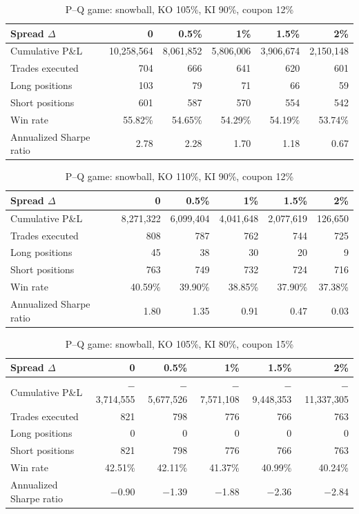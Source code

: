 \documentclass[12pt,letterpaper]{article}
\begin{document}
\begin{table}[ht]
\singlespacing
\centering
\caption{P--Q game: snowball, KO 105\%, KI 90\%, coupon 12\%}
\label{tab:snow3}
\begin{tabular}{lrrrrr}
\toprule
Spread $\Delta$ & 0 & 0.5\% & 1\% & 1.5\% & 2\% \\
\midrule
Cumulative P\&L & 10{,}258{,}564 & 8{,}061{,}852 & 5{,}806{,}006 & 3{,}906{,}674 & 2{,}150{,}148 \\
Trades executed & 704 & 666 & 641 & 620 & 601 \\
Long positions  & 103 & 79 & 71 & 66 & 59 \\
Short positions & 601 & 587 & 570 & 554 & 542 \\
Win rate & 55.82\% & 54.65\% & 54.29\% & 54.19\% & 53.74\% \\
Annualized Sharpe ratio & 2.78 & 2.28 & 1.70 & 1.18 & 0.67 \\
\bottomrule
\end{tabular}
\end{table}

\begin{table}[ht]
\singlespacing
\centering
\caption{P--Q game: snowball, KO 110\%, KI 90\%, coupon 12\%}
\label{tab:snow4}
\begin{tabular}{lrrrrr}
\toprule
Spread $\Delta$ & 0 & 0.5\% & 1\% & 1.5\% & 2\% \\
\midrule
Cumulative P\&L & 8{,}271{,}322 & 6{,}099{,}404 & 4{,}041{,}648 & 2{,}077{,}619 & 126{,}650 \\
Trades executed & 808 & 787 & 762 & 744 & 725 \\
Long positions  & 45 & 38 & 30 & 20 & 9 \\
Short positions & 763 & 749 & 732 & 724 & 716 \\
Win rate & 40.59\% & 39.90\% & 38.85\% & 37.90\% & 37.38\% \\
Annualized Sharpe ratio & 1.80 & 1.35 & 0.91 & 0.47 & 0.03 \\
\bottomrule
\end{tabular}
\end{table}

\begin{table}[ht]
\singlespacing
\centering
\caption{P--Q game: snowball, KO 105\%, KI 80\%, coupon 15\%}
\label{tab:snow5}
\begin{tabular}{lrrrrr}
\toprule
Spread $\Delta$ & 0 & 0.5\% & 1\% & 1.5\% & 2\% \\
\midrule
Cumulative P\&L & $-$3{,}714{,}555 & $-$5{,}677{,}526 & $-$7{,}571{,}108 & $-$9{,}448{,}353 & $-$11{,}337{,}305 \\
Trades executed & 821 & 798 & 776 & 766 & 763 \\
Long positions  & 0 & 0 & 0 & 0 & 0 \\
Short positions & 821 & 798 & 776 & 766 & 763 \\
Win rate & 42.51\% & 42.11\% & 41.37\% & 40.99\% & 40.24\% \\
Annualized Sharpe ratio & $-$0.90 & $-$1.39 & $-$1.88 & $-$2.36 & $-$2.84 \\
\bottomrule
\end{tabular}
\end{table}
\end{document}
